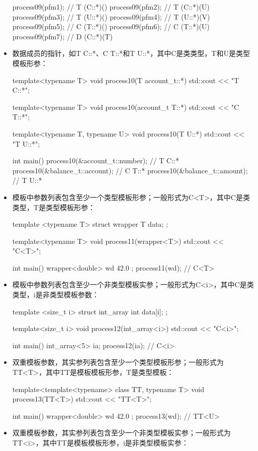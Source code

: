 \begin{itemize}
\begin{cppcode}
{	process09(pfm1); // T (C::*)()
	process09(pfm2); // T (C::*)(U)
	process09(pfm3); // T (U::*)()
	process09(pfm4); // T (U::*)(V)
	process09(pfm5); // C (T::*)()
	process09(pfm6); // C (T::*)(U)
	process09(pfm7); // D (C::*)(T)
}
\end{cppcode}
  \item 数据成员的指针，如T C::*、C T::*和T U::*，其中C是类类型，T和U是类型模板形参：

\begin{cppcode}
template<typename T>
void process10(T account_t::*)
{ std::cout << "T C::*\n"; }

template<typename T>
void process10(account_t T::*)
{ std::cout << "C T::*\n"; }

template<typename T, typename U>
void process10(T U::*) { std::cout << "T U::*\n"; }

int main()
{
	process10(&account_t::number); // T C::*
	process10(&balance_t::account); // C T::*
	process10(&balance_t::amount); // T U::*
}
\end{cppcode}
  \item 模板中参数列表包含至少一个类型模板形参；一般形式为C<T>，其中C是类类型，T是类型模板形参：

\begin{cppcode}
template <typename T>
struct wrapper
{
	T data;
};

template<typename T>
void process11(wrapper<T>) { std::cout << "C<T>\n"; }

int main()
{
	wrapper<double> wd{ 42.0 };
	process11(wd); // C<T>
}
\end{cppcode}
  \item 模板中参数列表包含至少一个非类型模板实参；一般形式为C<i>，其中C是类类型，i是非类型模板参数：

\begin{cppcode}
template <size_t i>
struct int_array
{
	int data[i];
};

template<size_t i>
void process12(int_array<i>) { std::cout << "C<i>\n"; }

int main()
{
	int_array<5> ia{};
	process12(ia); // C<i>
}
\end{cppcode}
  \item 双重模板参数，其实参列表包含至少一个类型模板形参；一般形式为TT<T>，其中TT是模板模板形参，T是类型模板：

\begin{cppcode}
template<template<typename> class TT, typename T>
void process13(TT<T>) { std::cout << "TT<T>\n"; }

int main()
{
	wrapper<double> wd{ 42.0 };
	process13(wd); // TT<U>
}
\end{cppcode}
  \item 双重模板参数，其实参列表包含至少一个非类型模板实参；一般形式为TT<i>，其中TT是模板模板形参，i是非类型模板实参：


\end{itemize}
